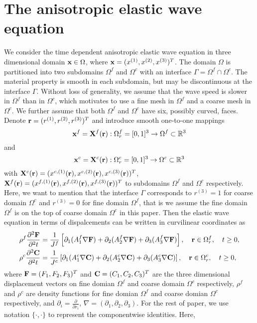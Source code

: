 \section{The anisotropic elastic wave equation }
We consider the time dependent anisotropic elastic wave equation in three dimensional domain ${\bf x}\in\Omega$, where ${\bf x} = (x^{(1)},x^{(2)},x^{(3)})^T$. 
The domain $\Omega$ is partitioned into two subdomains $\Omega^f$ and $\Omega^c$ with an interface $\Gamma = \Omega^f\cap\Omega^c$. The material property is smooth in each subdomain, but may be discontinuous at the interface $\Gamma$. Without loss of generality, we assume that the wave speed is slower in $\Omega^f$ than in $\Omega^c$, which motivates to use a fine mesh in $\Omega^f$ and a coarse mesh in $\Omega^c$.  We further assume that both $\Omega^f$ and $\Omega^c$ have six, possibly curved, faces. Denote ${\bf r} = (r^{(1)},r^{(2)},r^{(3)})^T$ and  introduce smooth one-to-one mappings
\[{\bf x}^{f} = {\bf X}^{f}({\bf r}) : \Omega^f_r = [0,1]^3 \rightarrow \Omega^{f} \subset \mathbb{R}^3 \]
and 
\[{\bf x}^{c} = {\bf X}^{c}({\bf r}) : \Omega^c_r = [0,1]^3 \rightarrow \Omega^{c} \subset \mathbb{R}^3\]
with ${\bf X}^{c}({\bf r}) = (x^{c,(1)}({\bf r}),x^{c,(2)}({\bf r}),x^{c,(3)}({\bf r}))^T$, ${\bf X}^{f}({\bf r}) = (x^{f,(1)}({\bf r}),x^{f,(2)}({\bf r}),x^{f,(3)}({\bf r}))^T$ to subdomains $\Omega^f$ and $\Omega^c$ respectively. Here, we want to mention that the interface $\Gamma$ corresponds to $r^{(3)} = 1$ for coarse domain $\Omega^c$ and $r^{(3)} = 0$ for fine domain $\Omega^f$, that is we assume the fine domain $\Omega^f$ is on the top of coarse domain $\Omega^c$ in this paper. Then the elastic wave equation in terms of dispalcements can be written in curvilinear coordinates as
\begin{align}\label{elastic_curvi}
	\rho^f\frac{\partial^2{\bf F}}{\partial^2 t} &= \frac{1}{J^f}\left[\partial_1(A_1^f\nabla{\bf F}) + \partial_2(A_2^f\nabla{\bf F}) +\partial_3(A_3^f\nabla{\bf F}) \right], \ \ \  {\bf r}\in\Omega^f_r,\ \ \  t\geq0,\nonumber\\
	\rho^c\frac{\partial^2{\bf C}}{\partial^2 t} &= \frac{1}{J^c}\left[\partial_1(A_1^c\nabla{\bf C}) + \partial_2(A_2^c\nabla{\bf C}) +\partial_3(A_3^c\nabla{\bf C}) \right],\ \ \  {\bf r}\in\Omega^c_r,\ \ \  t\geq0,
\end{align}
where ${\bf F} = (F_1,F_2,F_3)^T$ and ${\bf C} = (C_1,C_2,C_3)^T$ are the three dimensional displacement vectors on fine domian $\Omega^f$ and coarse domain $\Omega^c$ respectively, $\rho^f$ and $\rho^c$ are density functions for fine domian $\Omega^f$ and coarse domian $\Omega^c$ respectively, and $\partial_i = \frac{\partial}{\partial r_i}$, $\nabla = (\partial_1,\partial_2,\partial_3)$.  For the rest of paper, we use notation $\{\cdot,\cdot\}$ to represent the componentwise identities. Here,
